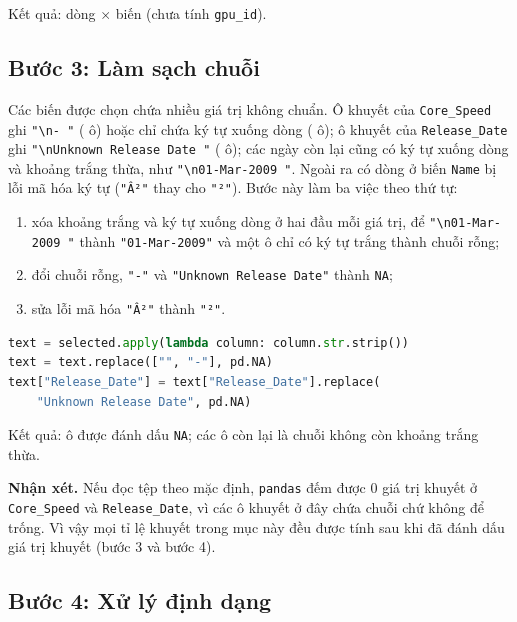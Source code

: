 Kết quả: \PreRowsRaw{} dòng $\times$ \PreColsSelected{} biến (chưa tính \texttt{gpu\_id}).

\subsection{Bước 3: Làm sạch chuỗi}

{\sloppy Các biến được chọn chứa nhiều giá trị không chuẩn. Ô khuyết của
\texttt{Core\_Speed} ghi \verb|"\n- "| (\PreCoreSpeedDash{} ô) hoặc chỉ chứa ký tự xuống
dòng (\PreCoreSpeedBlank{} ô); ô khuyết của \texttt{Release\_Date} ghi
\verb|"\nUnknown Release Date "| (\PreUnknownReleaseDate{} ô); các ngày còn lại cũng có ký
tự xuống dòng và khoảng trắng thừa, như \verb|"\n01-Mar-2009 "|. Ngoài ra có
\PreEncodingFixed{} dòng ở biến \texttt{Name} bị lỗi mã hóa ký tự (\verb|"Â²"| thay cho
\verb|"²"|). Bước này làm ba việc theo thứ tự:\par}
\begin{enumerate}
  \item xóa khoảng trắng và ký tự xuống dòng ở hai đầu mỗi giá trị, để
    \verb|"\n01-Mar-2009 "| thành \verb|"01-Mar-2009"| và một ô chỉ có ký tự trắng thành
    chuỗi rỗng;
  \item đổi chuỗi rỗng, \verb|"-"| và \verb|"Unknown Release Date"| thành \texttt{NA};
  \item sửa lỗi mã hóa \verb|"Â²"| thành \verb|"²"|.
\end{enumerate}

\begin{lstlisting}[language=Python, caption={Xóa khoảng trắng và đánh dấu giá trị khuyết}]
text = selected.apply(lambda column: column.str.strip())
text = text.replace(["", "-"], pd.NA)
text["Release_Date"] = text["Release_Date"].replace(
    "Unknown Release Date", pd.NA)
\end{lstlisting}

Kết quả: \PreCellsMarkedMissing{} ô được đánh dấu \texttt{NA}; các ô còn lại là chuỗi
không còn khoảng trắng thừa.

\textbf{Nhận xét.} Nếu đọc tệp theo mặc định, \texttt{pandas} đếm được 0 giá trị khuyết ở
\texttt{Core\_Speed} và \texttt{Release\_Date}, vì các ô khuyết ở đây chứa chuỗi chứ không
để trống. Vì vậy mọi tỉ lệ khuyết trong mục này đều được tính sau khi đã đánh dấu giá trị khuyết
(bước 3 và bước 4).

\subsection{Bước 4: Xử lý định dạng}

